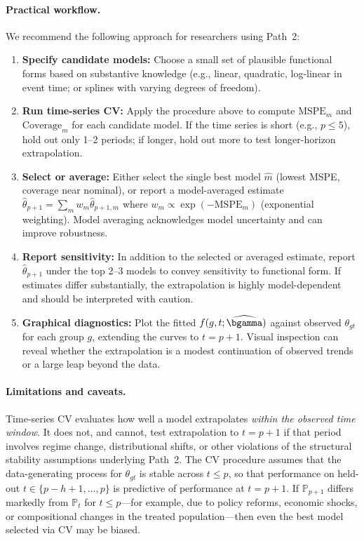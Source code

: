 \documentclass{article}
\renewcommand{\P}{\mathbb{P}}
\begin{document}
\paragraph{Practical workflow.}
We recommend the following approach for researchers using Path~2:

\begin{enumerate}
    \item \textbf{Specify candidate models:} Choose a small set of plausible functional forms based on substantive knowledge (e.g., linear, quadratic, log-linear in event time; or splines with varying degrees of freedom).
    \item \textbf{Run time-series CV:} Apply the procedure above to compute $\text{MSPE}_m$ and $\text{Coverage}_m$ for each candidate model. If the time series is short (e.g., $p \leq 5$), hold out only 1--2 periods; if longer, hold out more to test longer-horizon extrapolation.
    \item \textbf{Select or average:} Either select the single best model $\widehat{m}$ (lowest MSPE, coverage near nominal), or report a model-averaged estimate $\widehat{\theta}_{p+1} = \sum_m w_m \widehat{\theta}_{p+1,m}$ where $w_m \propto \exp(-\text{MSPE}_m)$ (exponential weighting). Model averaging acknowledges model uncertainty and can improve robustness.
    \item \textbf{Report sensitivity:} In addition to the selected or averaged estimate, report $\widehat{\theta}_{p+1}$ under the top 2--3 models to convey sensitivity to functional form. If estimates differ substantially, the extrapolation is highly model-dependent and should be interpreted with caution.
    \item \textbf{Graphical diagnostics:} Plot the fitted $f(g, t; \widehat{\bgamma})$ against observed $\theta_{gt}$ for each group $g$, extending the curves to $t = p+1$. Visual inspection can reveal whether the extrapolation is a modest continuation of observed trends or a large leap beyond the data.
\end{enumerate}

\paragraph{Limitations and caveats.}
Time-series CV evaluates how well a model extrapolates \emph{within the observed time window}. It does not, and cannot, test extrapolation to $t = p+1$ if that period involves regime change, distributional shifts, or other violations of the structural stability assumptions underlying Path~2. The CV procedure assumes that the data-generating process for $\theta_{gt}$ is stable across $t \leq p$, so that performance on held-out $t \in \{p-h+1, \ldots, p\}$ is predictive of performance at $t = p+1$. If $\P_{p+1}$ differs markedly from $\P_t$ for $t \leq p$---for example, due to policy reforms, economic shocks, or compositional changes in the treated population---then even the best model selected via CV may be biased.
\end{document}
